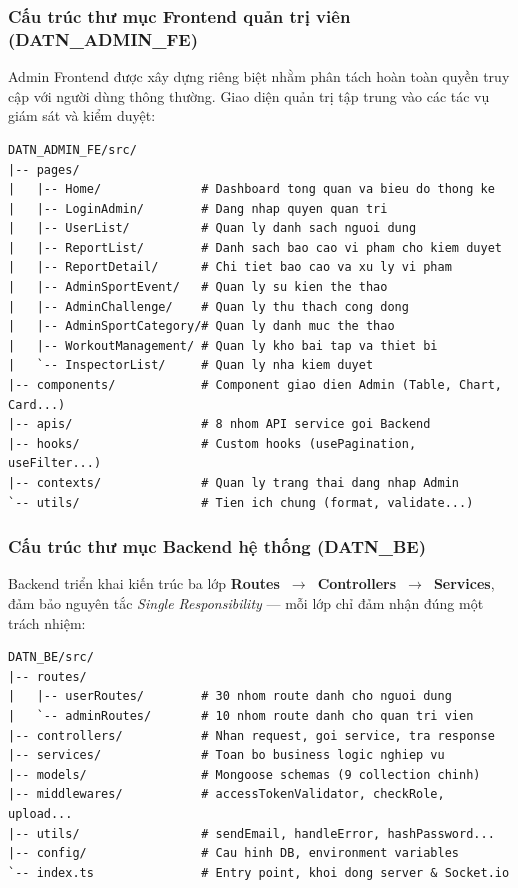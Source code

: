 \subsubsection{Cấu trúc thư mục Frontend quản trị viên (DATN\_ADMIN\_FE)}
\label{subsubsec:impl_admin_frontend_structure}

Admin Frontend được xây dựng riêng biệt nhằm phân tách hoàn toàn quyền truy cập với người dùng thông thường. Giao diện quản trị tập trung vào các tác vụ giám sát và kiểm duyệt:

\begin{lstlisting}[basicstyle=\ttfamily\small, frame=single, breaklines=true]
DATN_ADMIN_FE/src/
|-- pages/
|   |-- Home/              # Dashboard tong quan va bieu do thong ke
|   |-- LoginAdmin/        # Dang nhap quyen quan tri
|   |-- UserList/          # Quan ly danh sach nguoi dung
|   |-- ReportList/        # Danh sach bao cao vi pham cho kiem duyet
|   |-- ReportDetail/      # Chi tiet bao cao va xu ly vi pham
|   |-- AdminSportEvent/   # Quan ly su kien the thao
|   |-- AdminChallenge/    # Quan ly thu thach cong dong
|   |-- AdminSportCategory/# Quan ly danh muc the thao
|   |-- WorkoutManagement/ # Quan ly kho bai tap va thiet bi
|   `-- InspectorList/     # Quan ly nha kiem duyet
|-- components/            # Component giao dien Admin (Table, Chart, Card...)
|-- apis/                  # 8 nhom API service goi Backend
|-- hooks/                 # Custom hooks (usePagination, useFilter...)
|-- contexts/              # Quan ly trang thai dang nhap Admin
`-- utils/                 # Tien ich chung (format, validate...)
\end{lstlisting}

\subsubsection{Cấu trúc thư mục Backend hệ thống (DATN\_BE)}
\label{subsubsec:impl_backend_structure}

Backend triển khai kiến trúc ba lớp \textbf{Routes~$\rightarrow$~Controllers~$\rightarrow$~Services}, đảm bảo nguyên tắc \textit{Single Responsibility} --- mỗi lớp chỉ đảm nhận đúng một trách nhiệm:

\begin{lstlisting}[basicstyle=\ttfamily\small, frame=single, breaklines=true]
DATN_BE/src/
|-- routes/
|   |-- userRoutes/        # 30 nhom route danh cho nguoi dung
|   `-- adminRoutes/       # 10 nhom route danh cho quan tri vien
|-- controllers/           # Nhan request, goi service, tra response
|-- services/              # Toan bo business logic nghiep vu
|-- models/                # Mongoose schemas (9 collection chinh)
|-- middlewares/           # accessTokenValidator, checkRole, upload...
|-- utils/                 # sendEmail, handleError, hashPassword...
|-- config/                # Cau hinh DB, environment variables
`-- index.ts               # Entry point, khoi dong server & Socket.io
\end{lstlisting}

